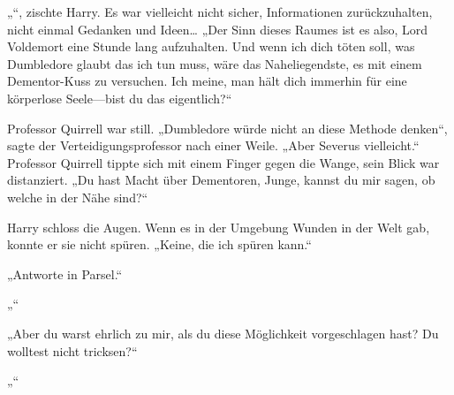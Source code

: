 „“, zischte Harry.
Es war vielleicht nicht sicher, Informationen zurückzuhalten, nicht einmal Gedanken und Ideen…
„Der Sinn dieses Raumes ist es also, Lord Voldemort eine Stunde lang aufzuhalten. Und wenn ich dich töten soll, was Dumbledore glaubt das ich tun muss, wäre das Naheliegendste, es mit einem Dementor-Kuss zu versuchen. Ich meine, man hält dich immerhin für eine körperlose Seele—bist du das eigentlich?“

Professor Quirrell war still.
„Dumbledore würde nicht an diese Methode denken“, sagte der Verteidigungsprofessor nach einer Weile. „Aber Severus vielleicht.“
Professor Quirrell tippte sich mit einem Finger gegen die Wange, sein Blick war distanziert.
„Du hast Macht über Dementoren, Junge, kannst du mir sagen, ob welche in der Nähe sind?“

Harry schloss die Augen.
Wenn es in der Umgebung Wunden in der Welt gab, konnte er sie nicht spüren.
„Keine, die ich spüren kann.“

„Antworte in Parsel.“

„“

„Aber du warst ehrlich zu mir, als du diese Möglichkeit vorgeschlagen hast? Du wolltest nicht tricksen?“

„“

